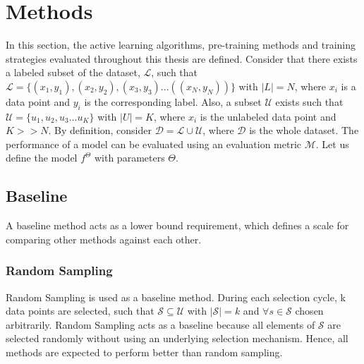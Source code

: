 
\chapter{Methods}\label{chapter:methods}
In this section, the active learning algorithms, pre-training methods and training strategies evaluated throughout this thesis are defined. Consider that there exists a labeled subset of the dataset, $\mathcal{L}$, such that $\mathcal{L} = \{(x_1, y_1), (x_2, y_2), (x_3, y_3) ... ((x_N, y_N))\}$ with $|L| = N$, where $x_i$ is a data point and $y_i$ is the corresponding label. Also, a subset $\mathcal{U}$ exists such that $\mathcal{U} = \{u_1, u_2, u_3 ... u_K\}$ with $|U| = K$, where $x_i$ is the unlabeled data point and $K>>N$. By definition, consider $\mathcal{D} = \mathcal{L} \cup \mathcal{U}$, where $\mathcal{D}$ is the whole dataset. The performance of a model can be evaluated using an evaluation metric $\mathcal{M}$. Let us define the model $f^\Theta$ with parameters $\Theta$.



\section{Baseline}\label{section:baseline}
A baseline method acts as a lower bound requirement, which defines a scale for comparing other methods against each other.
\subsection{Random Sampling}
Random Sampling is used as a baseline method. During each selection cycle, k data points are selected, such that $\mathcal{S} \subseteq \mathcal{U}$ with $|\mathcal{S}| = k$ and $\forall s \in \mathcal{S}$ chosen arbitrarily. Random Sampling acts as a baseline because all elements of $\mathcal{S}$ are selected randomly without using an underlying selection mechanism. Hence, all methods are expected to perform better than random sampling.

